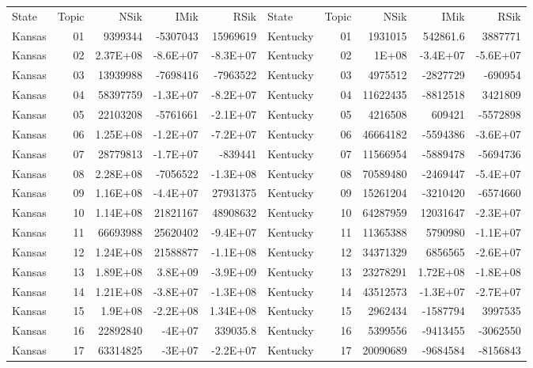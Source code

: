 \begin{table}[]
	\footnotesize
	\begin{tabular}{lrrrrlrrrr}
		State & Topic & NSik & IMik & RSik & State & Topic & NSik & IMik & RSik \\
		Kansas &  01  & 9399344 & -5307043 & 15969619 & Kentucky &  01  & 1931015 & 542861.6 & 3887771 \\
		Kansas &  02  & 2.37E+08 & -8.6E+07 & -8.3E+07 & Kentucky &  02  & 1E+08 & -3.4E+07 & -5.6E+07 \\
		Kansas &  03  & 13939988 & -7698416 & -7963522 & Kentucky &  03  & 4975512 & -2827729 & -690954 \\
		Kansas &  04  & 58397759 & -1.3E+07 & -8.2E+07 & Kentucky &  04  & 11622435 & -8812518 & 3421809 \\
		Kansas &  05  & 22103208 & -5761661 & -2.1E+07 & Kentucky &  05  & 4216508 & 609421 & -5572898 \\
		Kansas &  06  & 1.25E+08 & -1.2E+07 & -7.2E+07 & Kentucky &  06  & 46664182 & -5594386 & -3.6E+07 \\
		Kansas &  07  & 28779813 & -1.7E+07 & -839441 & Kentucky &  07  & 11566954 & -5889478 & -5694736 \\
		Kansas &  08  & 2.28E+08 & -7056522 & -1.3E+08 & Kentucky &  08  & 70589480 & -2469447 & -5.4E+07 \\
		Kansas &  09  & 1.16E+08 & -4.4E+07 & 27931375 & Kentucky &  09  & 15261204 & -3210420 & -6574660 \\
		Kansas &  10 & 1.14E+08 & 21821167 & 48908632 & Kentucky &  10 & 64287959 & 12031647 & -2.3E+07 \\
		Kansas &  11 & 66693988 & 25620402 & -9.4E+07 & Kentucky &  11 & 11365388 & 5790980 & -1.1E+07 \\
		Kansas &  12 & 1.24E+08 & 21588877 & -1.1E+08 & Kentucky &  12 & 34371329 & 6856565 & -2.6E+07 \\
		Kansas &  13 & 1.89E+08 & 3.8E+09 & -3.9E+09 & Kentucky &  13 & 23278291 & 1.72E+08 & -1.8E+08 \\
		Kansas &  14 & 1.21E+08 & -3.8E+07 & -1.3E+08 & Kentucky &  14 & 43512573 & -1.3E+07 & -2.7E+07 \\
		Kansas &  15 & 1.9E+08 & -2.2E+08 & 1.34E+08 & Kentucky &  15 & 2962434 & -1587794 & 3997535 \\
		Kansas &  16 & 22892840 & -4E+07 & 339035.8 & Kentucky &  16 & 5399556 & -9413455 & -3062550 \\
		Kansas &  17 & 63314825 & -3E+07 & -2.2E+07 & Kentucky &  17 & 20090689 & -9684584 & -8156843 \\

\end{tabular}
\end{table}
